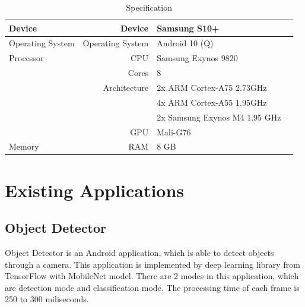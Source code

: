         \begin{table}[!htp]\centering
            \scriptsize
            \begin{tabular}{lrll}\toprule
                Device              &Device             &Samsung S10+ \\ \hline
                Operating System    &Operating System   &Android 10 (Q) \\ \hline
                Processor           &CPU                &Samsung Exynos 9820 \\
                                    &Cores              &8 \\
                                    &Architecture       &2x ARM Cortex-A75 2.73GHz \\
                                    &                   &4x ARM Cortex-A55 1.95GHz \\
                                    &                   &2x Samsung Exynos M4 1.95 GHz \\
                                    &GPU                &Mali-G76 \\ \hline
                Memory              &RAM                &8 GB \\
                \bottomrule
            \end{tabular}

            \caption{Specification}\label{specification}
        \end{table}


    \section{Existing Applications}
        \subsection{Object Detector}
            Object Detector is an Android application, which is able to detect objects through a camera.
            This application is implemented by deep learning library from TensorFlow with
            MobileNet model. There are 2 modes in this application,
            which are detection mode and classification mode.
            The processing time of each frame is 250 to 300 miliseconds.

